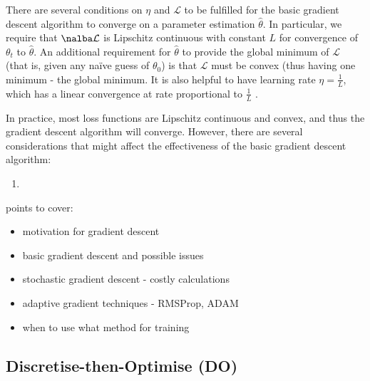\documentclass[a4paper,11pt,titlepage]{article}
\theoremstyle{definition}
\theoremstyle{plain}
\theoremstyle{remark}
\begin{document}
There are several conditions on $\eta$ and $\mathcal{L}$ to be fulfilled for the basic gradient descent algorithm to converge on a parameter estimation $\hat{\theta}$. In particular, we require that $\nalba\mathcal{L}$ is Lipschitz continuous with constant $L$ for convergence of $\theta_t$ to $\hat{\theta}$. An additional requirement for $\hat{\theta}$ to provide the global minimum of $\mathcal{L}$ (that is, given any naïve guess of $\theta_0$) is that $\mathcal{L}$ must be convex (thus having one minimum - the global minimum. It is also helpful to have learning rate $\eta = \frac{1}{L}$, which has a linear convergence at rate proportional to $\frac{1}{L}$ \cite{gower2015}. 

In practice, most loss functions are Lipschitz continuous and convex, and thus the gradient descent algorithm will converge. However, there are several considerations that might affect the effectiveness of the basic gradient descent algorithm:
\begin{enumerate}
    \item 
\end{enumerate}

points to cover:
\begin{itemize}
    \item motivation for gradient descent
    \item basic gradient descent and possible issues
    \item stochastic gradient descent - costly calculations
    \item adaptive gradient techniques - RMSProp, ADAM
    \item when to use what method for training
\end{itemize}

\subsection{Discretise-then-Optimise (DO)}
\label{sec:do}
\end{document}
